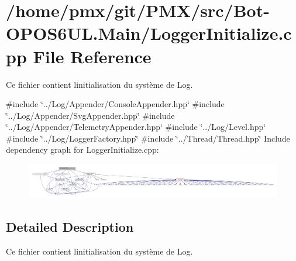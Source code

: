 \hypertarget{Bot-OPOS6UL_8Main_2LoggerInitialize_8cpp}{}\section{/home/pmx/git/\+P\+M\+X/src/\+Bot-\/\+O\+P\+O\+S6\+UL.Main/\+Logger\+Initialize.cpp File Reference}
\label{Bot-OPOS6UL_8Main_2LoggerInitialize_8cpp}


Ce fichier contient l\textquotesingle{}initialisation du système de Log.  


{\ttfamily \#include \char`\"{}../\+Log/\+Appender/\+Console\+Appender.\+hpp\char`\"{}}\newline
{\ttfamily \#include \char`\"{}../\+Log/\+Appender/\+Svg\+Appender.\+hpp\char`\"{}}\newline
{\ttfamily \#include \char`\"{}../\+Log/\+Appender/\+Telemetry\+Appender.\+hpp\char`\"{}}\newline
{\ttfamily \#include \char`\"{}../\+Log/\+Level.\+hpp\char`\"{}}\newline
{\ttfamily \#include \char`\"{}../\+Log/\+Logger\+Factory.\+hpp\char`\"{}}\newline
{\ttfamily \#include \char`\"{}../\+Thread/\+Thread.\+hpp\char`\"{}}\newline
Include dependency graph for Logger\+Initialize.\+cpp\+:
\nopagebreak
\begin{figure}[H]
\begin{center}
\leavevmode
\includegraphics[width=350pt]{Bot-OPOS6UL_8Main_2LoggerInitialize_8cpp__incl}
\end{center}
\end{figure}


\subsection{Detailed Description}
Ce fichier contient l\textquotesingle{}initialisation du système de Log. 

